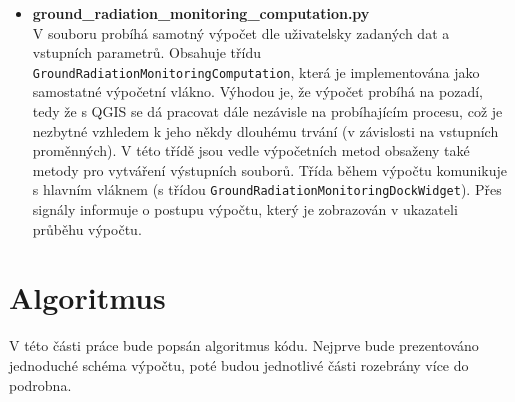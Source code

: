 \begin{itemize}
	\item \textbf{ground\_radiation\_monitoring\_computation.py} \\
		V souboru probíhá samotný výpočet dle uživatelsky zadaných dat a vstupních parametrů. Obsahuje třídu \texttt{GroundRadiationMonitoringComputation}, která je implementována jako samostatné výpočetní vlákno. Výhodou je, že výpočet probíhá na pozadí, tedy že s QGIS se dá pracovat dále nezávisle na probíhajícím procesu, což je nezbytné vzhledem k jeho někdy dlouhému trvání (v závislosti na vstupních proměnných). V této třídě jsou vedle výpočetních metod obsaženy také metody pro vytváření výstupních souborů. Třída během výpočtu komunikuje s hlavním vláknem (s třídou \texttt{GroundRadiationMonitoringDockWidget}). Přes signály informuje o postupu výpočtu, který je zobrazován v ukazateli průběhu výpočtu.
	
\end{itemize}

\section{Algoritmus}
V této části práce bude popsán algoritmus kódu. Nejprve bude prezentováno jednoduché schéma výpočtu, poté budou jednotlivé části rozebrány více do podrobna.
